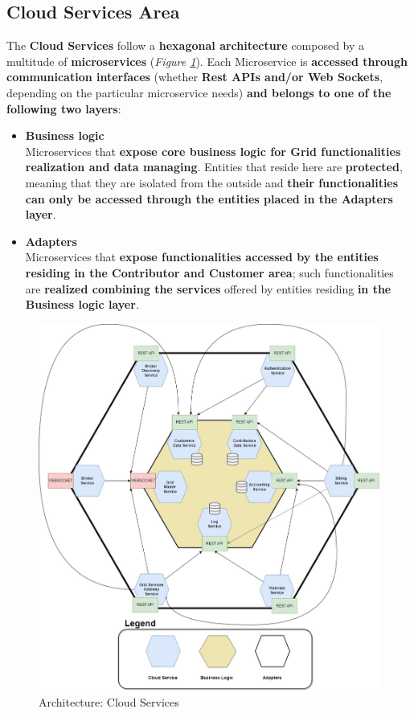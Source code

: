 \subsection{Cloud Services Area}\label{cloud_services_area}
The \textbf{Cloud Services} follow a \textbf{hexagonal architecture} composed by a multitude of \textbf{microservices} (\textit{Figure \ref{fig:architecture_cloud_services}}). Each Microservice is \textbf{accessed through communication interfaces} (whether \textbf{Rest APIs and/or Web Sockets}, depending on the particular microservice needs) \textbf{and belongs to one of the following two layers}:
\begin{itemize}
    \item \textbf{Business logic}\\
    Microservices that \textbf{expose core business logic for Grid functionalities realization and data managing}. Entities that  reside here are \textbf{protected}, meaning that they are isolated from the outside and \textbf{their functionalities can only be accessed through the entities placed in the Adapters layer}.
    \item \textbf{Adapters}\\
    Microservices that \textbf{expose functionalities accessed by the entities residing in the Contributor and Customer area}; such functionalities are \textbf{realized combining the services} offered by entities residing \textbf{in the Business logic layer}.
\end{itemize}
\begin{figure}[!ht]
    \centering
    \includegraphics[scale=0.35]{document/chapters/chapter_6/images/architecture_cloud_services.jpg}
    \caption{Architecture: Cloud Services}
    \label{fig:architecture_cloud_services}
\end{figure}

